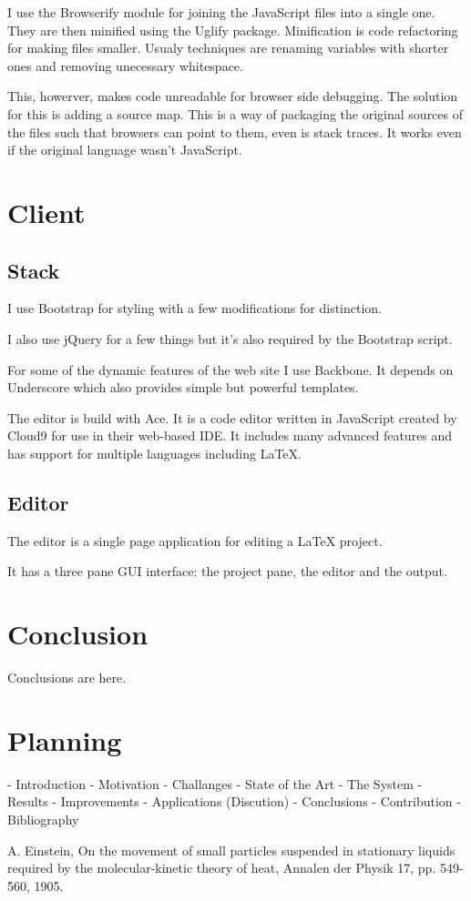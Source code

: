 \documentclass{llncs}
\begin{document}
I use the Browserify module for joining the JavaScript files into a single one. They are then minified using the Uglify package. Minification is code refactoring for making files smaller. Usualy techniques are renaming variables with shorter ones and removing unecessary whitespace.

This, howerver, makes code unreadable for browser side debugging. The solution for this is adding a source map. This is a way of packaging the original sources of the files such that browsers can point to them, even is stack traces. It works even if the original language wasn't JavaScript.

\section{Client}

\subsection{Stack}

I use Bootstrap for styling with a few modifications for distinction.

I also use jQuery for a few things but it's also required by the Bootstrap script.

For some of the dynamic features of the web site I use Backbone. It depends on Underscore which also provides simple but powerful templates.

The editor is build with Ace. It is a code editor written in JavaScript created by Cloud9 for use in their web-based IDE. It includes many advanced features and has support for multiple languages including \LaTeX{}.

\subsection{Editor}

The editor is a single page application for editing a \LaTeX{} project.

It has a three pane GUI interface: the project pane, the editor and the output.

\section{Conclusion}

Conclusions are here.

\section{Planning}

- Introduction
  - Motivation
  - Challanges
- State of the Art
- The System
- Results
- Improvements
- Applications (Discution)
- Conclusions
  - Contribution
- Bibliography

\begin{thebibliography}{1}

A. Einstein, On the movement of small particles suspended in stationary liquids required by the molecular-kinetic theory of heat, Annalen der Physik 17, pp. 549-560, 1905.

\end{thebibliography}
\end{document}

